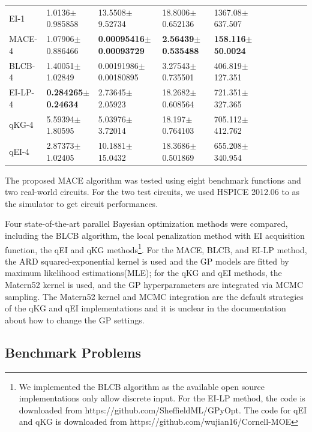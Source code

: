 \begin{table}[t]
\begin{tabular}{lllllllllll}
        EI-1    & 1.0136$\pm$0.985858           &  13.5508$\pm$9.52734                & 18.8006$\pm$0.652136          & 1367.08$\pm$637.507 \\
        MACE-4  & 1.07906$\pm$0.886466          &  \textbf{0.00095416$\pm$0.00093729} & \textbf{2.56439$\pm$0.535488} & \textbf{158.116$\pm$50.0024} \\
        BLCB-4  & 1.40051$\pm$1.02849           &  0.00191986$\pm$0.00180895          & 3.27543$\pm$0.735501          & 406.819$\pm$127.351 \\
        EI-LP-4 & \textbf{0.284265$\pm$0.24634} &  2.73645$\pm$2.05923                & 18.2682$\pm$0.608564          & 721.351$\pm$327.365 \\
        qKG-4   & 5.59394$\pm$1.80595           &  5.03976$\pm$3.72014                & 18.197$\pm$0.764103           & 705.112$\pm$412.762 \\
        qEI-4   & 2.87373$\pm$1.02405           &  10.1881$\pm$15.0432                & 18.3686$\pm$0.501869          & 655.208$\pm$340.954 \\
        \bottomrule
    \end{tabular}
\end{table}

The proposed MACE algorithm was tested using eight benchmark functions and two
real-world circuits. For the two test circuits, we used HSPICE 2012.06 to as
the simulator to get circuit performances. 

Four state-of-the-art parallel Bayesian optimization methods were compared,
including the BLCB algorithm, the local penalization method with EI acquisition
function, the qEI and qKG methods\footnote{We implemented the BLCB algorithm as
the available open source implementations only allow discrete input. For the
EI-LP method, the code is downloaded from
https://github.com/SheffieldML/GPyOpt. The code for qEI and qKG is downloaded
from https://github.com/wujian16/Cornell-MOE}. For the MACE, BLCB, and EI-LP
method, the ARD squared-exponential kernel is used and the GP models are fitted
by maximum likelihood estimations(MLE); for the qKG and qEI methods, the
Matern52 kernel is used, and the GP hyperparameters are integrated via MCMC
sampling. The Matern52 kernel and MCMC integration are the default strategies
of the qKG and qEI implementations and it is unclear in the documentation about
how to change the GP settings.


\subsection{Benchmark Problems}

